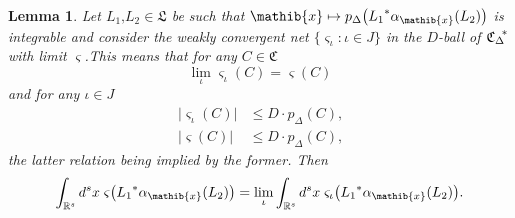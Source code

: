 \documentclass[11pt,twoside,openright]{report}
\theoremstyle{definition}
\theoremstyle{plain}
\newtheorem{Lem}[Def]{Lemma}
\theoremstyle{remark}
\theoremstyle{assumption}
\newcommand{\bset}[1]{\bigl\{ #1 \bigr\}}
\newcommand{\abs}[1]{\lvert #1 \rvert}
\newcommand{\pDx}[1]{p_\Delta ( #1 )}
\newcommand{\bpDx}[1]{p_\Delta \bigl( #1 \bigr)}
\newcommand{\Cfrak}{\mathfrak{C}}
\newcommand{\Lfrak}{\mathfrak{L}}
\newcommand{\xib}{\mathib{x}}
\newcommand{\Rs}{\mathbb{R}^s}
\newcommand{\CDstar}{{\mathfrak{C}_\Delta}^{\negthickspace *}}
\newcommand{\aibx}{\alpha_\mathib{x}}
\begin{document}
\begin{Lem}
  \label{Lem-varsigmanet-convergence}
  Let $L_1 \text{,} L_2 \in \Lfrak$ be such that $\xib \mapsto
  \bpDx{{L_1}^* \aibx ( L_2 )}$ is integrable and consider the weakly
  convergent net $\bset{\varsigma_\iota : \iota \in J}$ in the
  $D$-ball of $\CDstar$ with limit $\varsigma$.This means that for any
  $C \in \Cfrak$
  \begin{equation*}
    \lim_\iota \varsigma_\iota ( C ) = \varsigma ( C )
  \end{equation*}
  and for any $\iota \in J$
  \begin{subequations}
    \label{eq-varsigma-balls}
    \begin{align}
      \label{eq-varsigma-balls-1}
      \abs{\varsigma_\iota ( C )} & \leqslant D \cdot \pDx{C} \text{,}
      \\
      \label{eq-varsigma-balls-2}
      \abs{\varsigma ( C )} & \leqslant D \cdot \pDx{C} \text{,}
    \end{align}
  \end{subequations}
  the latter relation being implied by the former. Then
  \begin{equation}
    \label{eq-integral-net-limits}
    \int_{\Rs} d^s x \; \varsigma \bigl( {L_1}^* \aibx ( L_2 ) \bigr)
    = \lim_\iota \int_{\Rs} d^s x \; \varsigma_\iota \bigl( {L_1}^*
    \aibx ( L_2 ) \bigr) \text{.}
  \end{equation}
\end{Lem}
\end{document}
